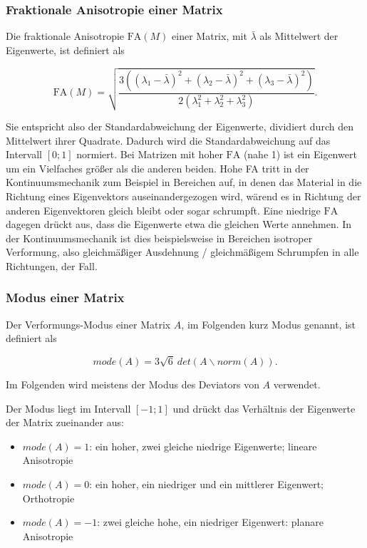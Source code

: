 \documentclass[a4paper,fontsize=12pt,toc=bib,halfparskip,ngerman]{scrartcl}
\begin{document}
\subsubsection{Fraktionale Anisotropie einer Matrix}
Die fraktionale Anisotropie $\text{FA}(M)$ einer Matrix, mit $\bar{\lambda}$ als Mittelwert der Eigenwerte, ist definiert als

\begin{equation}
	\text{FA}(M) = \sqrt{\frac{3((\lambda_1 - \bar{\lambda})^2 + (\lambda_2 - \bar{\lambda})^2 + (\lambda_3 - \bar{\lambda})^2)}{2(\lambda_1^2 + \lambda_2^2 + \lambda_3^2)}}.
\end{equation}

Sie entspricht also der Standardabweichung der Eigenwerte, dividiert durch den Mittelwert ihrer Quadrate. Dadurch wird die Standardabweichung auf das Intervall $[0;1]$ normiert. Bei Matrizen mit hoher $\text{FA}$ (nahe 1) ist ein Eigenwert um ein Vielfaches gr\"o{\ss}er als die anderen beiden. Hohe FA tritt in der Kontinuumsmechanik zum Beispiel in Bereichen auf, in denen das Material in die Richtung eines Eigenvektors auseinandergezogen wird, w\"arend es in Richtung der anderen Eigenvektoren gleich bleibt oder sogar schrumpft. Eine niedrige $\text{FA}$ dagegen dr\"uckt aus, dass die Eigenwerte etwa die gleichen Werte annehmen. In der Kontinuumsmechanik ist dies beispielsweise in Bereichen isotroper Verformung, also gleichm\"a{\ss}iger Ausdehnung / gleichm\"a{\ss}igem Schrumpfen in alle Richtungen, der Fall.

\subsubsection{Modus einer Matrix}
Der Verformungs-Modus \cite{criscione2000invariant} einer Matrix $A$, im Folgenden kurz Modus genannt, ist definiert als

\begin{equation}
	mode(A) = 3\sqrt{6}~det(A\backslash norm(A)).
\end{equation}

Im Folgenden wird meistens der Modus des Deviators von $A$ verwendet.

Der Modus liegt im Intervall $[-1;1]$ und dr\"uckt das Verh\"altnis der Eigenwerte der Matrix zueinander aus:

\begin{itemize}
	\item $mode(A) = 1$: ein hoher, zwei gleiche niedrige Eigenwerte; lineare Anisotropie
	\item $mode(A) = 0$: ein hoher, ein niedriger und ein mittlerer Eigenwert; Orthotropie
	\item $mode(A) = -1$: zwei gleiche hohe, ein niedriger Eigenwert: planare Anisotropie
\end{itemize} 
\end{document}
